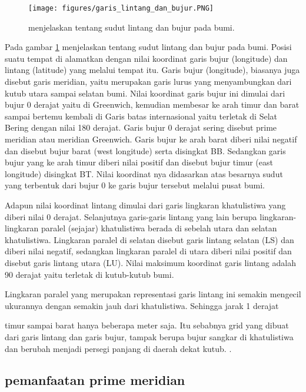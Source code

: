 	
\begin{figure}[ht]
\centerline{\texttt{[image: figures/garis\_lintang\_dan\_bujur.PNG]}}
\caption{menjelaskan tentang sudut lintang dan bujur pada bumi.}
\label{garis_lintang_dan_bujur}
\end{figure}

Pada gambar \ref{garis_lintang_dan_bujur} menjelaskan tentang sudut lintang dan bujur pada bumi. Posisi suatu tempat di alamatkan dengan nilai koordinat garis bujur (longitude) dan lintang (latitude) yang melalui tempat itu. Garis bujur (longitude), 
biasanya juga disebut garis meridian, yaitu merupakan garis lurus yang menyambungkan dari kutub utara sampai selatan bumi. Nilai koordinat garis bujur ini dimulai dari
bujur 0 derajat yaitu di Greenwich, kemudian membesar ke arah timur dan barat sampai bertemu kembali di Garis batas internasional yaitu terletak 
di Selat Bering dengan nilai 180 derajat. Garis bujur 0 derajat sering disebut prime meridian atau meridian Greenwich. Garis bujur ke arah barat diberi 
nilai negatif dan disebut bujur barat (west longitude) serta disingkat BB. Sedangkan garis bujur yang ke arah timur diberi nilai positif 
dan disebut bujur timur (east longitude) disingkat BT. Nilai koordinat nya didasarkan atas besarnya sudut yang terbentuk dari bujur 0 ke garis bujur tersebut
 melalui pusat bumi.

	Adapun nilai koordinat lintang dimulai dari garis lingkaran khatulistiwa yang diberi nilai 0 derajat. Selanjutnya garis-garis lintang yang lain berupa 
lingkaran-lingkaran paralel (sejajar) khatulistiwa berada di sebelah utara dan selatan khatulistiwa. Lingkaran paralel di selatan disebut garis lintang selatan (LS)
dan diberi nilai negatif, sedangkan lingkaran paralel di utara diberi nilai positif dan disebut garis lintang utara (LU). Nilai maksimum koordinat 
garis lintang adalah 90 derajat yaitu terletak di kutub-kutub bumi.

	Lingkaran paralel yang merupakan representasi garis lintang ini semakin mengecil ukurannya dengan semakin jauh dari khatulistiwa. Sehingga jarak 1 derajat 

timur sampai barat hanya beberapa meter saja. Itu sebabnya grid yang dibuat dari garis lintang dan garis bujur, tampak berupa bujur sangkar di khatulistiwa 
dan berubah menjadi persegi panjang di daerah dekat kutub. \cite {zuhdi2012sistem}.


\subsection{pemanfaatan prime meridian}


